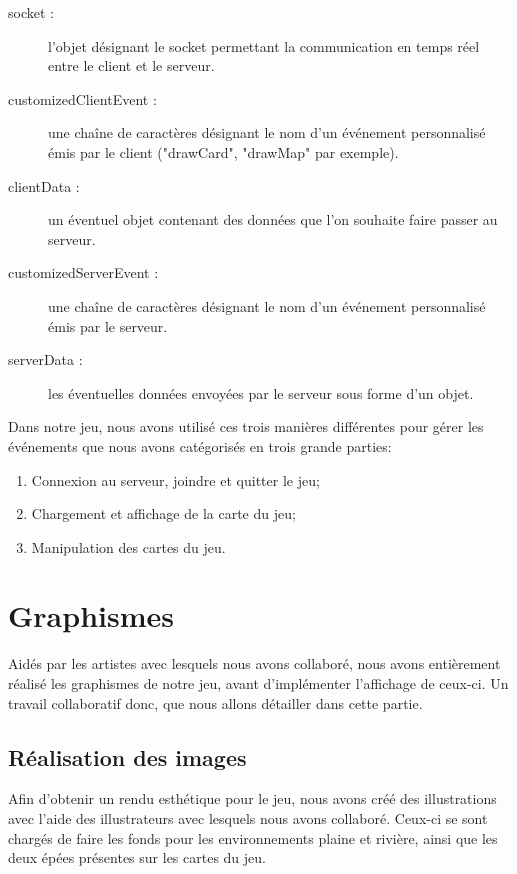 \documentclass[12pt]{report}
\begin{document}
	\begin{description}
		\item [socket :]{
			l'objet désignant le socket permettant la communication en temps réel entre le client et le serveur.
		}
		\item [customizedClientEvent :]{
			une chaîne de caractères désignant le nom d'un événement personnalisé émis par le client ("drawCard", "drawMap" par exemple).
		}
		\item [clientData :]{
			un éventuel objet contenant des données que l'on souhaite faire passer au serveur.
		}
		\item [customizedServerEvent :]{
			une chaîne de caractères désignant le nom d'un événement personnalisé émis par le serveur.
		}
		\item [serverData :]{
			les éventuelles données envoyées par le serveur sous forme d'un objet.
		}
	\end{description}

	Dans notre jeu, nous avons utilisé ces trois manières différentes pour gérer les événements que nous avons catégorisés en trois grande parties:
	\begin{enumerate}
		\item{Connexion au serveur, joindre et quitter le jeu;}
		\item{Chargement et affichage de la carte du jeu;}
		\item{Manipulation des cartes du jeu.}
	\end{enumerate}

  \section{Graphismes}
	Aidés par les artistes avec lesquels nous avons collaboré, nous avons entièrement réalisé les graphismes de notre jeu, avant d'implémenter l'affichage de ceux-ci. Un travail collaboratif donc, que nous allons détailler dans cette partie.

    \subsection{Réalisation des images}
		Afin d'obtenir un rendu esthétique pour le jeu, nous avons créé des illustrations avec l'aide des illustrateurs avec lesquels nous avons collaboré. Ceux-ci se sont chargés de faire les fonds pour les environnements plaine et rivière, ainsi que les deux épées présentes sur les cartes du jeu.
\end{document}
